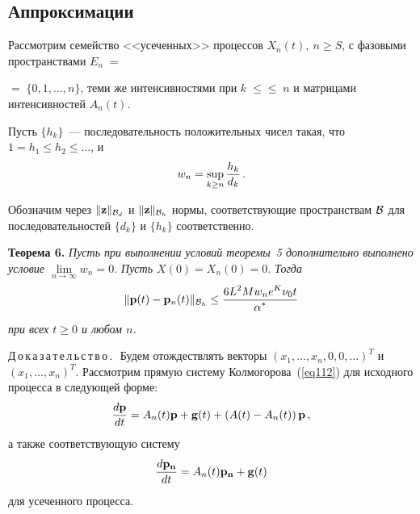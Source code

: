 \begin{multicols}{2}
\vspace*{-6pt}
\section{Аппроксимации}

\vspace*{-3pt}

Рассмотрим семейство <<усеченных>> процессов $X_n(t), \ n \ge S$, с
фазовыми пространствами $E_n\; =$\linebreak\vspace*{-12pt}
\pagebreak

\noindent
 $=\;\{0,1,\dots,n\}$, теми же
интенсивностями при  $k\; \le$\linebreak $\le\; n$ и матрицами интенсивностей $A_n(t)$.

Пусть $\{h_k\}$~--- последовательность положительных чисел такая, что
$1 = h_1 \le h_2 \le \dots$, и
\begin{equation*}
w_n = \sup_{k\ge n} \displaystyle\frac{\displaystyle h_k\mathstrut}{\displaystyle d_k\mathstrut}\,.
\end{equation*}

Обозначим через $\|{\bf z}\|_{{\cal B}_d}$ и $\|{\bf z}\|_{{\cal
B}_h}$ нормы, соответствующие пространствам ${\cal B}$ для
последовательностей $\{d_k\}$ и $\{h_k\}$ соответственно.


\medskip

\noindent
\textbf{Теорема 6.}
\textit{Пусть при выполнении условий теоремы~5 дополнительно
выполнено условие  $\lim\limits_{n \to \infty} w_n = 0.$ Пусть $X(0) = X_n
(0) = 0.$ Тогда}
\begin{equation*}
\|{\bf p} (t) - {\bf p}_n (t)\|_{{\cal B}_h} \le \displaystyle\frac{\displaystyle 6L^2Mw_n
e^K\nu_0t\mathstrut}{\displaystyle \alpha^*\mathstrut}
\end{equation*}
\textit{при всех $t \ge 0$ и любом $n$.}


\medskip

\noindent
Д\,о\,к\,а\,з\,а\,т\,е\,л\,ь\,с\,т\,в\,о\,.\ \,Будем отождествлять векторы
$\left(x_1,\dots,x_n,0,0,\dots\right)^T$ и $\left(x_1,\dots,x_n
\right)^T$. Рас\-смот\-рим прямую систему Колмогорова~(\ref{eq112}) для
исходного процесса  в следующей форме:
\begin{equation*}
\displaystyle\frac{\displaystyle d\mathbf{p}\mathstrut}{\displaystyle dt\mathstrut}=A_n(t) \mathbf{p} + {\bf g}(t) +\left(A(t) -
A_n(t) \right) \mathbf{p}\,, 
\end{equation*}
а также соответствующую систему
\begin{equation}
\displaystyle\frac{\displaystyle d\mathbf{p_n}\mathstrut}{\displaystyle dt\mathstrut}=A_n(t) \mathbf{p_n} +  {\bf g}(t)
\label{cat061}
\end{equation}
для усеченного процесса.


\end{multicols}
